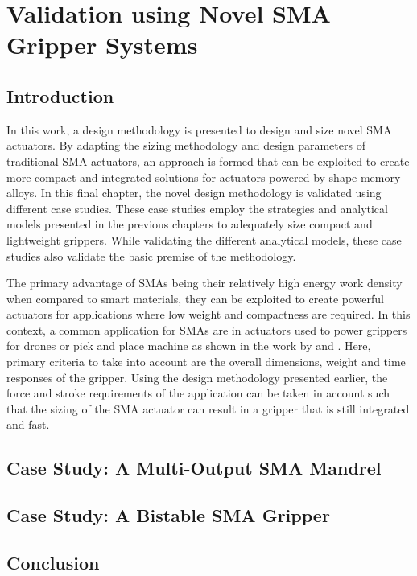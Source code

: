 
\chapter{Validation using Novel SMA Gripper Systems}\label{chap:case-study}
\section{Introduction}
In this work, a design methodology is presented to design and size novel SMA actuators. By adapting the sizing methodology and design parameters of traditional SMA actuators, an approach is formed that can be exploited to create more compact and integrated solutions for actuators powered by shape memory alloys. In this final chapter, the novel design methodology is validated using different case studies. These case studies employ the strategies and analytical models presented in the previous chapters to adequately size compact and lightweight grippers. While validating the different analytical models, these case studies also validate the basic premise of the methodology.

The primary advantage of SMAs being their relatively high energy work density when compared to smart materials, they can be exploited to create powerful actuators for applications where low weight and compactness are required. In this context, a common application for SMAs are in actuators used to power grippers for drones or pick and place machine as shown in the work by \todocite and \todocite. Here, primary criteria to take into account are the overall dimensions, weight and time responses of the gripper. Using the design methodology presented earlier, the force and stroke requirements of the application can be taken in account such that the sizing of the SMA actuator can result in a gripper that is still integrated and fast.
\section{Case Study: A Multi-Output SMA Mandrel}\label{sec:smacm-mandrel}
\section{Case Study: A Bistable SMA Gripper}\label{sec:smabb-gripper}
\section{Conclusion}
